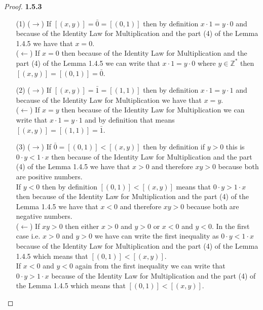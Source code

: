 \documentclass[11pt]{article}
\newcommand{\Z}{\mathbb{Z}}
\theoremstyle{definition}
\begin{document}
    \begin{proof}{\textbf{1.5.3}}
        \begin{itemize}
        \item [(1)]
        ($\rightarrow$) If $[(x,y)]=\bar{0}=[(0,1)]$ then by definition $x\cdot 1 = y \cdot 0$
        and because of the Identity Law for Multiplication and the part (4) of the Lemma
        1.4.5 we have that $x=0$.\\
        ($\leftarrow$) If $x = 0$ then because of the Identity Law for Multiplication
        and the part (4) of the Lemma 1.4.5 we can write that $x\cdot 1=y\cdot 0$ where
        $y\in\Z^*$ then $[(x,y)]=[(0,1)]=\bar{0}$.
        \item [(2)]
        ($\rightarrow$) If $[(x,y)]=\bar{1}=[(1,1)]$ then by definition $x\cdot 1 = y\cdot 1$ and
        because of the Identity Law for Multiplication we have that $x=y$.\\
        ($\leftarrow$) If $x = y$ then because of the Identity Law for Multiplication
        we can write that $x\cdot 1=y\cdot 1$ and by definition that means $[(x,y)]=[(1,1)]=\bar{1}$.
        \item [(3)]
        ($\rightarrow$) If $\bar{0}=[(0,1)]<[(x,y)]$ then by definition if $y>0$ this is
        $0\cdot y < 1 \cdot x$ then because of the Identity Law for Multiplication and
        the part (4) of the Lemma 1.4.5 we have that $x>0$ and therefore $xy>0$ because
        both are positive numbers.\\
        If $y<0$ then by definition $[(0,1)]<[(x,y)]$ means that $0\cdot y>1\cdot x$
        then because of the Identity Law for Multiplication and the part (4) of the
        Lemma 1.4.5 we have that $x<0$ and therefore $xy>0$ because both are negative
        numbers.\\
        ($\leftarrow$) If $xy>0$ then either $x>0$ and $y>0$ or $x<0$ and $y<0$. In the
        first case i.e. $x>0$ and $y>0$ we have can write the first inequality as
        $0\cdot y<1 \cdot x$ because of the Identity Law for Multiplication and the part
        (4) of the Lemma 1.4.5 which means that $[(0,1)]<[(x,y)]$.\\
        If $x<0$ and $y<0$ again from the first inequality we can write that
        $0\cdot y>1\cdot x$ because of the Identity Law for Multiplication and the part
        (4) of the Lemma 1.4.5 which means that $[(0,1)]<[(x,y)]$.
        \end{itemize}
    \end{proof}
\end{document}
